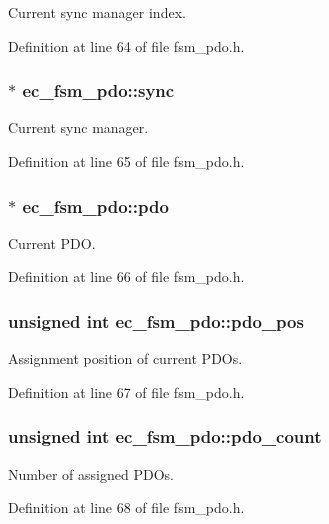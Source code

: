 \-Current sync manager index. 



\-Definition at line 64 of file fsm\-\_\-pdo.\-h.

\subsubsection[{sync}]{$\ast$ {\bf ec\-\_\-fsm\-\_\-pdo\-::sync}}\label{structec__fsm__pdo_a38e76d6856ae5035b91bf5b0850218ad}


\-Current sync manager. 



\-Definition at line 65 of file fsm\-\_\-pdo.\-h.

\subsubsection[{pdo}]{$\ast$ {\bf ec\-\_\-fsm\-\_\-pdo\-::pdo}}\label{structec__fsm__pdo_a437d446a8f8d784d8622ed302b3d51a1}


\-Current \-P\-D\-O. 



\-Definition at line 66 of file fsm\-\_\-pdo.\-h.

\subsubsection[{pdo\-\_\-pos}]{\setlength{\rightskip}{0pt plus 5cm}unsigned int {\bf ec\-\_\-fsm\-\_\-pdo\-::pdo\-\_\-pos}}\label{structec__fsm__pdo_aec477e3e790d99da798a44e7523c0508}


\-Assignment position of current \-P\-D\-Os. 



\-Definition at line 67 of file fsm\-\_\-pdo.\-h.

\subsubsection[{pdo\-\_\-count}]{\setlength{\rightskip}{0pt plus 5cm}unsigned int {\bf ec\-\_\-fsm\-\_\-pdo\-::pdo\-\_\-count}}\label{structec__fsm__pdo_a60d790b9858292f2229115dabc994c08}


\-Number of assigned \-P\-D\-Os. 



\-Definition at line 68 of file fsm\-\_\-pdo.\-h.

